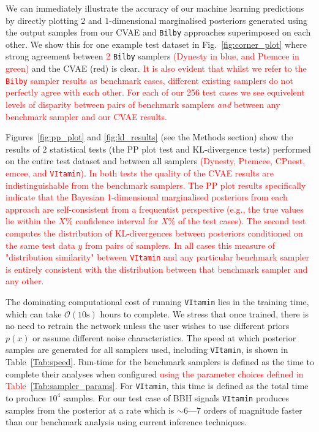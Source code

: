 \documentclass[%
showpacs,
 amsmath,amssymb,
 aps,
 twocolumn,
 prl,
 reprint,
floatfix,
]{revtex4-1}
\newcommand{\new}[1]{\textcolor{red}{#1}}
\begin{document}
%
%
We can immediately illustrate the accuracy of our machine learning predictions
by directly plotting 2 and 1-dimensional marginalised posteriors generated
using the output samples from our \ac{CVAE} and \texttt{Bilby} approaches
superimposed on each other. We show this for one example test dataset in
Fig.~\ref{fig:corner_plot} where strong agreement between \new{2} \texttt{Bilby}
samplers \new{(Dynesty in blue, and Ptemcee in green)} and the \ac{CVAE} (red) is
clear. \new{It is also evident that whilst we refer to the \texttt{Bilby} sampler
results as benchmark cases, different existing samplers do not perfectly agree
with each other. For each of our 256 test cases we see equivelent levels of
disparity between pairs of benchmark samplers \emph{and} between any benchmark
sampler and our \ac{CVAE} results.}  

%
%
Figures~\ref{fig:pp_plot} and \ref{fig:kl_results} (see the Methods section)
show the results of 2 statistical tests (the \ac{PP} plot test and
\ac{KL}-divergence tests) performed on the entire test dataset and between all
samplers \new{(Dynesty, Ptemcee, CPnest, emcee, and \texttt{VItamin})}. \new{In
both tests the quality of the \ac{CVAE} results are indistinguishable from the
benchmark samplers. The \ac{PP} plot results specifically indicate that the
Bayesian 1-dimensional marginalised posteriors from each approach are
self-consistent from a frequentist perspective (e.g., the true values lie
within the $X\%$ confidence interval for $X\%$ of the test cases). The second
test computes the distribution of \ac{KL}-divergences between posteriors
conditioned on the same test data $y$ from pairs of samplers. In all cases this
measure of "distribution similarity" between \texttt{VItamin} and any particular
benchmark sampler is entirely consistent with the distribution between that
benchmark sampler and any other.}   

%
%
The dominating computational cost of running \texttt{VItamin} lies in the
training time, which can take $\mathcal{O}(10\text{s})$ hours to complete. We
stress that once trained, there is no need to retrain the network unless the
user wishes to use different priors $p(x)$ or assume different noise
characteristics. The speed at which posterior samples are generated for all
samplers used, including \texttt{VItamin}, is shown in Table~\ref{Tab:speed}.
Run-time for the benchmark samplers is defined as the time to complete their
analyses when configured \new{using the parameter choices defined in
Table~\ref{Tab:sampler_params}}. For \texttt{VItamin}, this time is defined as
the total time to produce $10^4$ samples. For our test case of \ac{BBH} signals
\texttt{VItamin} produces samples from the posterior at a rate which is $\sim
6$---$7$ orders of magnitude faster than our benchmark analysis using current
inference techniques. 
\end{document}
